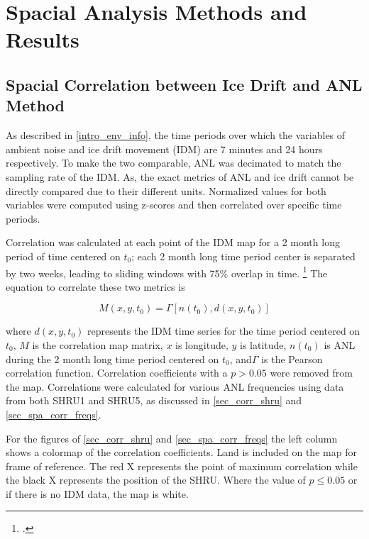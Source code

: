 \section{Spacial Analysis Methods and Results}


\subsection{Spacial Correlation between Ice Drift and ANL Method} \label{sec_corr_method}

As described in \autoref{intro_env_info}, the time periods over which the variables of ambient noise and ice drift movement (IDM) are 7 minutes and 24 hours respectively. To make the two comparable, ANL was decimated to match the sampling rate of the IDM. As, the exact metrics of ANL and ice drift cannot be directly compared due to their different units. Normalized values for both variables were computed using z-scores and then correlated over specific time periods. 

Correlation was calculated at each point of the IDM map for a 2 month long period of time centered on $t_{0}$; each 2 month long time period center is separated by two weeks, leading to sliding windows with 75\% overlap in time. \footcite[]{Bonnel2021} The equation to correlate these two metrics is 

\begin{equation}    \label{eq_spacialcorr}
    M(x,y,t_{0})=\Gamma [n(t_{0}),d(x,y,t_{0})]
\end{equation}
 
where $d(x,y,t_{0})$ represents the IDM time series for the time period centered on $t_0$, $M$ is the correlation map matrix, $x$ is longitude, $y$ is latitude, $n(t_0)$ is ANL during the 2 month long time period centered on $t_0$, and$\Gamma$ is the Pearson correlation function. Correlation coefficients with a $p>0.05$ were removed from the map. Correlations were calculated for various ANL frequencies using data from both SHRU1 and SHRU5, as discussed in \autoref{sec_corr_shru} and \autoref{sec_spa_corr_freqs}.%


For the figures of \autoref{sec_corr_shru} and \autoref{sec_spa_corr_freqs} the left column shows a colormap of the correlation coefficients. Land is included on the map for frame of reference. The red X represents the point of maximum correlation while the black X represents the position of the SHRU. Where the value of $p\leq0.05$ or if there is no IDM data, the map is white. 

